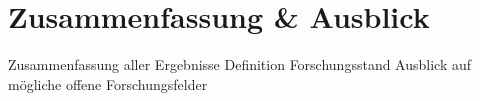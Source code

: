 \section{Zusammenfassung & Ausblick}

Zusammenfassung aller Ergebnisse
Definition Forschungsstand
Ausblick auf mögliche offene Forschungsfelder